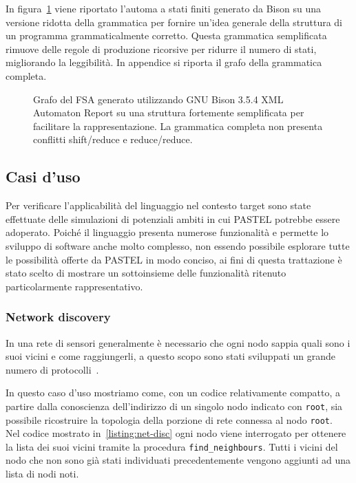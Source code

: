 \documentclass[10pt]{article}
\begin{document}
In figura~\ref{fig:parser_simple} viene riportato l'automa a stati finiti generato da Bison su una versione ridotta della grammatica per fornire un'idea generale della struttura di un programma grammaticalmente corretto. Questa grammatica semplificata rimuove delle regole di produzione ricorsive per ridurre il numero di stati, migliorando la leggibilità. In appendice si riporta il grafo della grammatica completa.


\begin{figure}
	\centering
	\caption{Grafo del FSA generato utilizzando  GNU Bison 3.5.4 XML Automaton Report su una struttura fortemente semplificata per facilitare la rappresentazione. La grammatica completa non presenta conflitti shift/reduce e reduce/reduce.}
	\label{fig:parser_simple}
\end{figure}

\subsection{Casi d'uso}\label{subsection:casi-d_uso}
Per verificare l'applicabilità del linguaggio nel contesto target sono state effettuate delle simulazioni di potenziali ambiti in cui PASTEL potrebbe essere adoperato. Poiché il linguaggio presenta numerose funzionalità e permette lo sviluppo di software anche molto complesso, non essendo possibile esplorare tutte le possibilità offerte da PASTEL in modo conciso, ai fini di questa trattazione è stato scelto di mostrare un sottoinsieme delle funzionalità ritenuto particolarmente rappresentativo.

\subsubsection{Network discovery}\label{subsubsection:net-disc}
In una rete di sensori generalmente è necessario che ogni nodo sappia quali sono i suoi vicini e come raggiungerli, a questo scopo sono stati sviluppati un grande numero di protocolli~\cite{narten1998neighbor, kandhalu2010u, alsa2012secure}.

In questo caso d'uso mostriamo come, con un codice relativamente compatto, a partire dalla conoscienza dell'indirizzo di un singolo nodo indicato con \texttt{root}, sia possibile ricostruire la topologia della porzione di rete connessa al nodo \texttt{root}.\\
Nel codice mostrato in~\ref{listing:net-disc} ogni nodo viene interrogato per ottenere la lista dei suoi vicini tramite la procedura \texttt{find\_neighbours}. Tutti i vicini del nodo che non sono già stati individuati precedentemente vengono aggiunti ad una lista di nodi noti.
\end{document}
